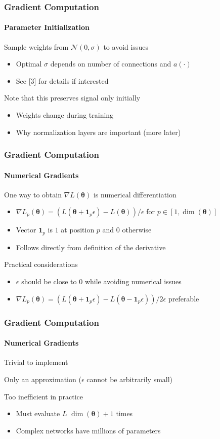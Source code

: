 \documentclass[xetex,professionalfont]{beamer}
\renewcommand\emph[1]{\textcolor{tuwcvl_cvl_blue}{#1}}
\newcommand{\bth}{\boldsymbol{\theta}}
\begin{document}
\begin{frame}
  \frametitle{Gradient Computation}
  \framesubtitle{Parameter Initialization}
  
    Sample weights from $\mathcal{N}(0,\sigma)$ to avoid issues
    \begin{itemize}
        \item Optimal $\sigma$ depends on number of connections and $a(\cdot)$ %
        \item See [3] for details if interested
    \end{itemize}
  
    \bigskip
    Note that this preserves signal only initially
    \begin{itemize}
      \item Weights change during training
      \item Why normalization layers are important (more later)
    \end{itemize}
    
  \end{frame}


\begin{frame}
\frametitle{Gradient Computation}
\framesubtitle{Numerical Gradients}

One way to obtain $\nabla L(\bth)$ is \emph{numerical differentiation}
\begin{itemize}
    \item $\nabla L_p(\bth)=(L(\bth+\boldsymbol{1}_p\epsilon)-L(\bth))/\epsilon$ for $p\in[1,\dim(\bth)]$ %
    \item Vector $\boldsymbol{1}_p$ is $1$ at position $p$ and $0$ otherwise
    \item Follows directly from definition of the derivative %
\end{itemize}

\bigskip

Practical considerations
\begin{itemize}
    \item $\epsilon$ should be close to $0$ while avoiding numerical issues %
    \item $\nabla L_p(\bth)=(L(\bth+\boldsymbol{1}_p\epsilon)-L(\bth-\boldsymbol{1}_p\epsilon))/2\epsilon$ preferable %
\end{itemize}

\end{frame}


\begin{frame}
\frametitle{Gradient Computation}
\framesubtitle{Numerical Gradients}

Trivial to implement

\bigskip

Only an approximation ($\epsilon$ cannot be arbitrarily small)

\bigskip

Too inefficient in practice
\begin{itemize}
    \item Must evaluate $L$ $\dim(\bth)+1$ times
    \item Complex networks have millions of parameters
\end{itemize}

\end{frame}
\end{document}
